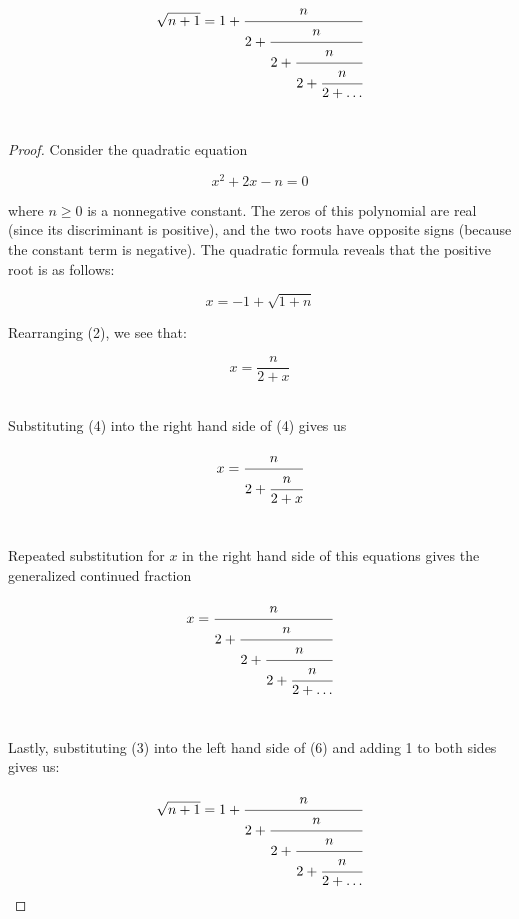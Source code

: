 \documentclass[a4paper,11pt]{article}
\begin{document}
\begin{equation}
  \sqrt{n+1}= 1 + \cfrac{n}{2
      		      + \cfrac{n}{2
          	      + \cfrac{n}{2 + \cfrac{n}{2+\ldots} } } }
\end{equation}\

\begin{proof}
Consider the quadratic equation 

\begin{equation}
x^2 + 2x - n=0
\end{equation}

\noindent where $n \ge 0$ is a nonnegative constant. The zeros of this polynomial are real (since its discriminant is positive), and the two roots have opposite signs (because the constant term is negative). The quadratic formula reveals that the positive root is as follows: 

\begin{equation}
  x = -1 + \sqrt{1+n}
\end{equation}

Rearranging (2), we see that:

\begin{equation}
x = \frac{n}{2+x}
\end{equation}\

Substituting (4) into the right hand side of (4) gives us

\begin{equation}
 x=  \cfrac{n}{2
        + \cfrac{n}{2+x} }
\end{equation}\

Repeated substitution for $x$ in the right hand side of this equations gives the generalized continued fraction 

\begin{equation}
  x=  \cfrac{n}{2
      		      + \cfrac{n}{2
          	      + \cfrac{n}{2 + \cfrac{n}{2+\ldots} } } }
\end{equation}\

Lastly, substituting (3) into the left hand side of (6) and adding 1 to both sides gives us:

\begin{equation}
  \sqrt{n+1}= 1 + \cfrac{n}{2
      		      + \cfrac{n}{2
          	      + \cfrac{n}{2 + \cfrac{n}{2+\ldots} } } }
\end{equation}

\end{proof}
\end{document}
